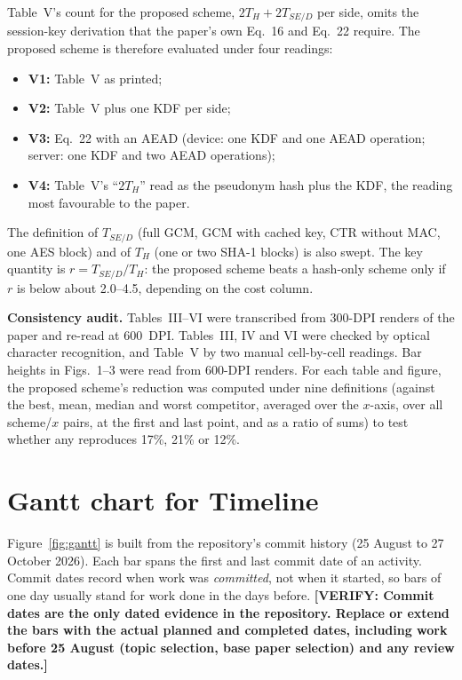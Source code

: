 \documentclass[12pt,a4paper,oneside]{report}
\numberwithin{equation}{chapter}
\newcommand{\VERIFY}[1]{\textcolor{orange!85!black}{\textbf{[VERIFY: #1]}}}
\begin{document}
Table~V's count for the proposed scheme, $2T_H + 2T_{SE/D}$ per side, omits the session-key derivation that the paper's own Eq.~16 and Eq.~22 require. The proposed scheme is therefore evaluated under four readings:
\begin{itemize}[nosep]
  \item \textbf{V1:} Table~V as printed;
  \item \textbf{V2:} Table~V plus one KDF per side;
  \item \textbf{V3:} Eq.~22 with an AEAD (device: one KDF and one AEAD operation; server: one KDF and two AEAD operations);
  \item \textbf{V4:} Table~V's ``$2T_H$'' read as the pseudonym hash plus the KDF, the reading most favourable to the paper.
\end{itemize}
The definition of $T_{SE/D}$ (full GCM, GCM with cached key, CTR without MAC, one AES block) and of $T_H$ (one or two SHA-1 blocks) is also swept. The key quantity is $r = T_{SE/D}/T_H$: the proposed scheme beats a hash-only scheme only if $r$ is below about 2.0--4.5, depending on the cost column.

\textbf{Consistency audit.} Tables~III--VI were transcribed from 300-DPI renders of the paper and re-read at 600~DPI. Tables~III, IV and VI were checked by optical character recognition, and Table~V by two manual cell-by-cell readings. Bar heights in Figs.~1--3 were read from 600-DPI renders. For each table and figure, the proposed scheme's reduction was computed under nine definitions (against the best, mean, median and worst competitor, averaged over the $x$-axis, over all scheme/$x$ pairs, at the first and last point, and as a ratio of sums) to test whether any reproduces 17\%, 21\% or 12\%.

\section{Gantt chart for Timeline}
Figure~\ref{fig:gantt} is built from the repository's commit history (25 August to 27 October 2026). Each bar spans the first and last commit date of an activity. Commit dates record when work was \emph{committed}, not when it started, so bars of one day usually stand for work done in the days before. \VERIFY{Commit dates are the only dated evidence in the repository. Replace or extend the bars with the actual planned and completed dates, including work before 25 August (topic selection, base paper selection) and any review dates.}
\end{document}
